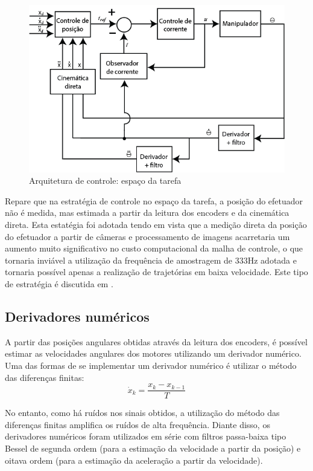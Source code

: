 \documentclass[]{politex}
\begin{document}
\begin{figure}[H]
    \centering
    \includegraphics[scale=0.5]{imagens/ControleEspacoDaTarefa.png}
    \caption{Arquitetura de controle: espaço da tarefa}
    \label{fig:ControleEspacoDaTarefa}
\end{figure}

Repare que na estratégia de controle no espaço da tarefa, a posição do efetuador não é medida, mas estimada a partir da leitura dos encoders e da cinemática direta. Esta estatégia foi adotada tendo em vista que a medição direta da posição do efetuador a partir de câmeras e processamento de imagens acarretaria um aumento muito significativo no custo computacional da malha de controle, o que tornaria inviável a utilização da frequência de amostragem de 333Hz adotada e tornaria possível apenas a realização de trajetórias em baixa velocidade. Este tipo de estratégia é discutida em \cite{Craig}.

\subsection{Derivadores numéricos}
\label{derivador}

A partir das posições angulares obtidas através da leitura dos encoders, é possível estimar as velocidades angulares dos motores utilizando um derivador numérico. Uma das formas de se implementar um derivador numérico é utilizar o método das diferenças finitas:
\begin{equation}
\dot{x}_k = \frac{x_k - x_{k-1}}{T}
\end{equation}

No entanto, como há ruídos nos sinais obtidos, a utilização  do método das diferenças finitas amplifica os ruídos de alta frequência. Diante disso, os derivadores numéricos foram utilizados em série com filtros passa-baixa tipo Bessel de segunda ordem (para a estimação da velocidade a partir da posição) e oitava ordem (para a estimação da aceleração a partir da velocidade).
\end{document}
